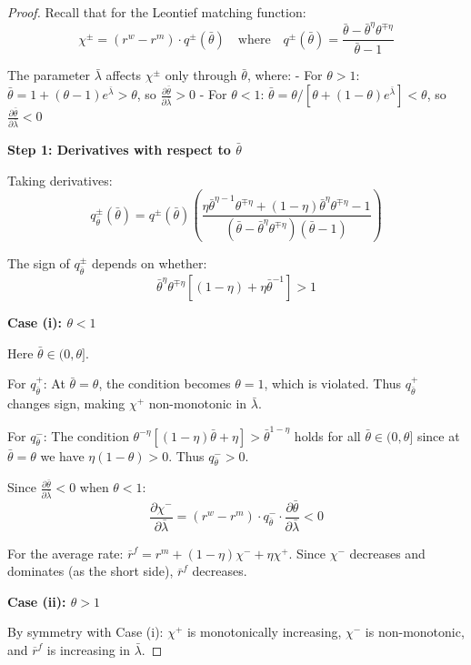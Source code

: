 \begin{proof}
Recall that for the Leontief matching function:
\[
\chi^{\pm} = (r^{w}-r^{m})\cdot q^{\pm}(\bar{\theta}) \quad \text{where} \quad q^{\pm}(\bar{\theta}) = \frac{\bar{\theta} - \bar{\theta}^{\eta}\theta^{\mp\eta}}{\bar{\theta}-1}
\]

The parameter $\bar{\lambda}$ affects $\chi^{\pm}$ only through $\bar{\theta}$, where:
- For $\theta > 1$: $\bar{\theta} = 1 + (\theta-1)e^{\bar{\lambda}} > \theta$, so $\frac{\partial\bar{\theta}}{\partial\bar{\lambda}} > 0$
- For $\theta < 1$: $\bar{\theta} = \theta/[\theta + (1-\theta)e^{\bar{\lambda}}] < \theta$, so $\frac{\partial\bar{\theta}}{\partial\bar{\lambda}} < 0$

\textbf{Step 1: Derivatives with respect to $\bar{\theta}$}

Taking derivatives:
\[
q^{\pm}_{\bar{\theta}}(\bar{\theta}) = q^{\pm}(\bar{\theta})\left(\frac{\eta\bar{\theta}^{\eta-1}\theta^{\mp\eta} + (1-\eta)\bar{\theta}^{\eta}\theta^{\mp\eta} - 1}{(\bar{\theta} - \bar{\theta}^{\eta}\theta^{\mp\eta})(\bar{\theta}-1)}\right)
\]

The sign of $q^{\pm}_{\bar{\theta}}$ depends on whether:
\[
\bar{\theta}^{\eta}\theta^{\mp\eta}[(1-\eta) + \eta\bar{\theta}^{-1}] > 1
\]

\textbf{Case (i): $\theta < 1$}

Here $\bar{\theta} \in (0, \theta]$. 

For $q^{+}_{\bar{\theta}}$: At $\bar{\theta} = \theta$, the condition becomes $\theta = 1$, which is violated. Thus $q^{+}_{\bar{\theta}}$ changes sign, making $\chi^{+}$ non-monotonic in $\bar{\lambda}$.

For $q^{-}_{\bar{\theta}}$: The condition $\theta^{-\eta}[(1-\eta)\bar{\theta} + \eta] > \bar{\theta}^{1-\eta}$ holds for all $\bar{\theta} \in (0,\theta]$ since at $\bar{\theta} = \theta$ we have $\eta(1-\theta) > 0$. Thus $q^{-}_{\bar{\theta}} > 0$.

Since $\frac{\partial\bar{\theta}}{\partial\bar{\lambda}} < 0$ when $\theta < 1$:
\[
\frac{\partial\chi^{-}}{\partial\bar{\lambda}} = (r^{w}-r^{m}) \cdot q^{-}_{\bar{\theta}} \cdot \frac{\partial\bar{\theta}}{\partial\bar{\lambda}} < 0
\]

For the average rate: $\overline{r}^{f} = r^{m} + (1-\eta)\chi^{-} + \eta\chi^{+}$. Since $\chi^{-}$ decreases and dominates (as the short side), $\overline{r}^{f}$ decreases.

\textbf{Case (ii): $\theta > 1$}

By symmetry with Case (i): $\chi^{+}$ is monotonically increasing, $\chi^{-}$ is non-monotonic, and $\overline{r}^{f}$ is increasing in $\bar{\lambda}$.


\end{proof}
